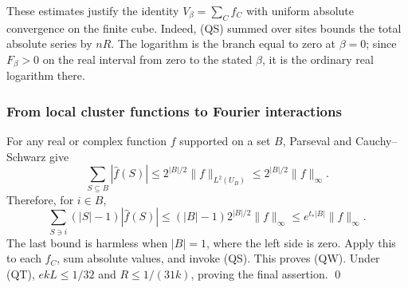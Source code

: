 These estimates justify the identity
\(V_\beta=\sum_C f_C\) with uniform absolute convergence on the
finite cube.  Indeed, (QS) summed over sites bounds the total absolute
series by \(nR\).  The logarithm is the branch equal to zero at
\(\beta=0\); since \(F_\beta>0\) on the real interval from zero
to the stated \(\beta\), it is the ordinary real logarithm there.

\subsubsection{From local cluster functions to Fourier interactions}

For any real or complex function \(f\) supported on a set \(B\),
Parseval and Cauchy--Schwarz give
\[
 \sum_{S\subseteq B}|\widehat f(S)|
 \le 2^{|B|/2}\|f\|_{L^2(U_B)}
 \le 2^{|B|/2}\|f\|_\infty.
\]
Therefore, for \(i\in B\),
\[
 \sum_{S\ni i}(|S|-1)|\widehat f(S)|
 \le (|B|-1)2^{|B|/2}\|f\|_\infty
 \le e^{t_*|B|}\|f\|_\infty.
\]
The last bound is harmless when \(|B|=1\), where the left side is
zero.  Apply this to each \(f_C\), sum absolute values, and invoke
(QS).  This proves (QW).  Under (QT), \(ekL\le1/32\) and
\(R\le1/(31k)\), proving the final assertion. \qed
